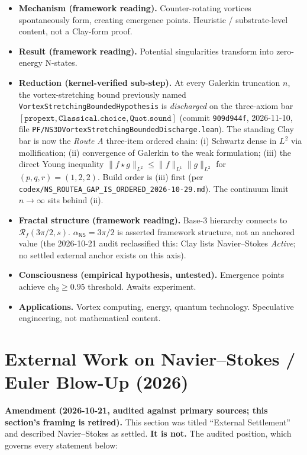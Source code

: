 \begin{itemize}
\item \textbf{Mechanism (framework reading).} Counter-rotating vortices spontaneously form, creating emergence points.  Heuristic / substrate-level content, not a Clay-form proof.
\item \textbf{Result (framework reading).} Potential singularities transform into zero-energy N-states.
\item \textbf{Reduction (kernel-verified sub-step).} At every Galerkin truncation $n$, the vortex-stretching bound previously named \texttt{VortexStretchingBoundedHypothesis} is \emph{discharged} on the three-axiom bar $[\mathtt{propext}, \mathtt{Classical.choice}, \mathtt{Quot.sound}]$ (commit \texttt{909d944f}, 2026-11-10, file \texttt{PF/NS3DVortexStretchingBoundedDischarge.lean}).  The standing Clay bar is now the \emph{Route A} three-item ordered chain: (i) Schwartz dense in $L^2$ via mollification; (ii) convergence of Galerkin to the weak formulation; (iii) the direct Young inequality $\lVert f \star g\rVert_{L^2} \le \lVert f\rVert_{L^1}\lVert g\rVert_{L^2}$ for $(p, q, r) = (1, 2, 2)$.  Build order is (iii) first (per \texttt{codex/NS\_ROUTEA\_GAP\_IS\_ORDERED\_2026-10-29.md}).  The continuum limit $n \to \infty$ sits behind (ii).
\item \textbf{Fractal structure (framework reading).} Base-3 hierarchy connects to $\mathcal{R}_f(3\pi/2, s)$.  $\alpha_{\textsf{NS}} = 3\pi/2$ is asserted framework structure, not an anchored value (the 2026-10-21 audit reclassified this: Clay lists Navier--Stokes \emph{Active}; no settled external anchor exists on this axis).
\item \textbf{Consciousness (empirical hypothesis, untested).} Emergence points achieve $\mathrm{ch}_2 \ge 0.95$ threshold.  Awaits experiment.
\item \textbf{Applications.} Vortex computing, energy, quantum technology.  Speculative engineering, not mathematical content.
\end{itemize}

\section{External Work on Navier--Stokes / Euler Blow-Up (2026)}
\label{sec:openai-2026-corroboration}

\noindent\textbf{Amendment (2026-10-21, audited against primary sources; this
section's framing is retired).} This section was titled ``External
Settlement'' and described Navier--Stokes as settled. \textbf{It is not.} The
audited position, which governs every statement below:

